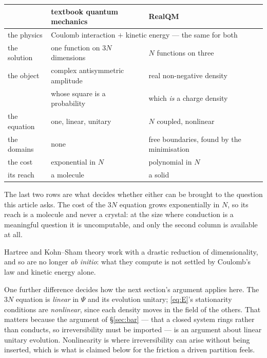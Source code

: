 \documentclass[11pt]{article}
\begin{document}
\begin{center}
\small
\begin{tabular}{@{}lll@{}}
\toprule
 & textbook quantum mechanics & RealQM \\
\midrule
the physics    & \multicolumn{2}{l}{Coulomb interaction $+$ kinetic energy --- the same for both} \\
\midrule
the solution   & one function on $3N$ dimensions & $N$ functions on three \\
the object     & complex antisymmetric amplitude & real non-negative density \\
               & whose square is a probability   & which \emph{is} a charge density \\
the equation   & one, linear, unitary            & $N$ coupled, nonlinear \\
the domains    & none                            & free boundaries, found by the minimisation \\
\midrule
the cost       & exponential in $N$              & polynomial in $N$ \\
its reach      & a molecule                      & a solid \\
\bottomrule
\end{tabular}
\end{center}

\noindent The last two rows are what decides whether either can be brought to the question this
article asks. The cost of the $3N$ equation grows exponentially in $N$, so its reach is a molecule
and never a crystal: at the size where conduction is a meaningful question it is uncomputable, and
only the second column is available at all.

Hartree and Kohn--Sham theory work with a drastic reduction of dimensionality, and so are no longer
\emph{ab initio}: what they compute is not settled by Coulomb's law and kinetic energy alone.

One further difference decides how the next section's argument applies here. The $3N$ equation is
\emph{linear} in $\Psi$ and its evolution unitary; \eqref{eq:E}'s stationarity conditions are
\emph{nonlinear}, since each density moves in the field of the others. That matters because the
argument of \S\ref{sec:bar} --- that a closed system rings rather than conducts, so irreversibility
must be imported --- is an argument about linear unitary evolution. Nonlinearity is where
irreversibility can arise without being inserted, which is what is claimed below for the friction a
driven partition feels.
\end{document}
